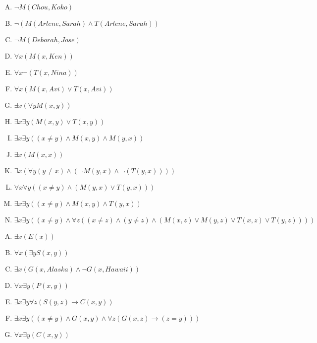 {{        %
        \begin{practices}
            \begin{enumerate}[A.]
                \item $\neg M(Chou, Koko)$
                \item $\neg (M(Arlene, Sarah) \wedge T(Arlene, Sarah))$
                \item $\neg M(Deborah, Jose)$
                \item $\forall x (M(x, Ken))$
                \item $\forall x \neg (T(x, Nina))$
                \item $\forall x (M(x, Avi) \vee T(x, Avi))$
                \item $\exists x (\forall y M(x, y))$
                \item $\exists x \exists y (M(x, y) \vee T(x, y))$
                \item $\exists x \exists y ((x \neq y) \wedge M(x, y) \wedge M(y, x))$
                \item $\exists x (M(x, x))$
                \item $\exists x (\forall y (y \neq x) \wedge (\neg M(y, x) \wedge \neg (T(y, x))))$
                \item $\forall x \forall y ((x \neq y) \wedge (M(y, x) \vee T(y, x)))$
                \item $\exists x \exists y ((x \neq y) \wedge M(x, y) \wedge T(y, x))$
                \item $\exists x \exists y ((x \neq y) \wedge \forall z ((x \neq z) \wedge (y \neq z) \wedge (M(x, z) \vee M(y, z) \vee T(x, z) \vee T(y, z))))$
            \end{enumerate}
        \end{practices}

        \begin{practices}
            \begin{enumerate}[A.]
                \item $\exists x (E(x))$
                \item $\forall x (\exists y S(x, y))$
                \item $\exists x (G(x, Alaska) \wedge \neg G(x, Hawaii))$
                \item $\forall x \exists y (P(x, y))$
                \item $\exists x \exists y \forall z (S(y, z) \rightarrow C(x, y))$
                \item $\exists x \exists y ((x \neq y) \wedge G(x, y) \wedge \forall z (G(x, z) \rightarrow (z = y)))$
                \item $\forall x \exists y (C(x, y))$
            \end{enumerate}
        \end{practices}

}}
